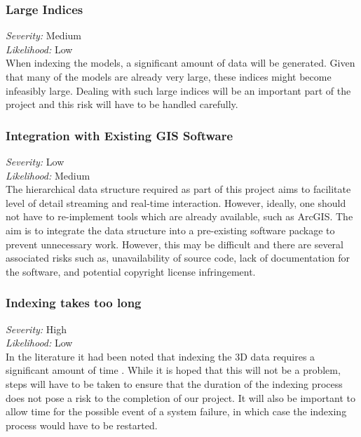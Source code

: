 \documentclass[12pt,a4paper]{article}
\begin{document}
\subsubsection*{Large Indices}
\noindent \textit{Severity: } Medium \\
\noindent \textit{Likelihood: } Low \\
When indexing the models, a significant amount of data will be generated.
Given that many of the models are already very large, these indices might
become infeasibly large. Dealing with such large indices will be an important
part of the project and this risk will have to be handled carefully.
\subsubsection*{Integration with Existing GIS Software}
\noindent \textit{Severity: } Low \\
\noindent \textit{Likelihood: } Medium \\
The hierarchical data structure required as part of this project aims to facilitate level
of detail streaming and real-time interaction. However, ideally, one should not have to
re-implement tools which are already available, such as ArcGIS. The aim is to integrate
the data structure into a pre-existing software package to prevent unnecessary work.
However, this may be difficult and there are several associated risks such as,
unavailability of source code, lack of documentation for the software, and potential
copyright license infringement.
\subsubsection*{Indexing takes too long}
\noindent \textit{Severity: } High \\
\noindent \textit{Likelihood: } Low \\
In the literature it had been noted that indexing the 3D data requires a significant
amount of time \cite{interactivepointclouds}. While it is hoped that this will not be
a problem, steps will have to be taken to ensure that the duration of the indexing
process does not pose a risk to the completion of our project. It will also be important
to allow time for the possible event of a system failure, in which case the indexing
process would have to be restarted.
\end{document}

